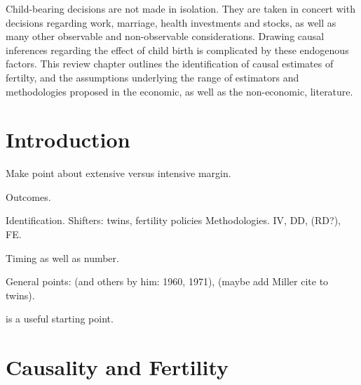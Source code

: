 \begin{chapabstract}
Child-bearing decisions are not made in isolation.  They are taken in concert 
with decisions regarding work, marriage, health investments and stocks, as well 
as many other observable and non-observable considerations.  Drawing causal 
inferences regarding the effect of child birth is complicated by these 
endogenous factors.  This review chapter outlines the identification of causal
estimates of fertilty, and the assumptions underlying the range of estimators
and methodologies proposed in the economic, as well as the non-economic, 
literature.
\end{chapabstract}

\newpage
\section{Introduction}
Make point about extensive versus intensive margin.

Outcomes.

Identification.  Shifters: twins, fertility policies
Methodologies. IV, DD, (RD?), FE.

Timing as well as number.

General points: \citet{Enke1966} (and others by him: 1960, 1971), 
\citet{KearneyLevine2012, Schultz2008, GMiller2009, RosenzweigWolpin1986}
(maybe add Miller cite to twins).

\citet{Moffitt2005} is a useful starting point.


\newpage
\section{Causality and Fertility}
\label{Fscn:causality}

